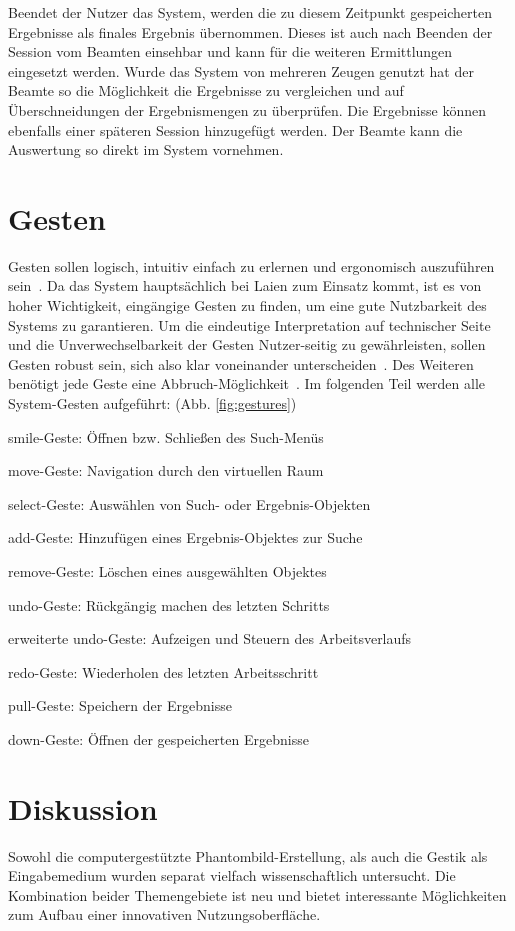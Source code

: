 \documentclass{sigchi-ext}
\begin{document}
Beendet der Nutzer das System, werden die zu diesem Zeitpunkt gespeicherten Ergebnisse als finales Ergebnis übernommen. Dieses ist auch nach Beenden der Session vom Beamten einsehbar und kann für die weiteren Ermittlungen eingesetzt werden. Wurde das System von mehreren Zeugen genutzt hat der Beamte so die Möglichkeit die Ergebnisse zu vergleichen und auf Überschneidungen der Ergebnismengen zu überprüfen. Die Ergebnisse können ebenfalls einer späteren Session hinzugefügt werden. Der Beamte kann die Auswertung so direkt im System vornehmen.

\section{Gesten}
Gesten sollen logisch, intuitiv einfach zu erlernen und ergonomisch auszuführen sein~\cite{3dinteraction:book}. 
Da das System hauptsächlich bei Laien zum Einsatz kommt, ist es von hoher Wichtigkeit, eingängige Gesten zu finden, um eine gute Nutzbarkeit des Systems zu garantieren.
Um die eindeutige Interpretation auf technischer Seite und die Unverwechselbarkeit der Gesten Nutzer-seitig zu gewährleisten, sollen Gesten robust sein, sich also klar voneinander unterscheiden~\cite{3dinteraction:book,Dorau11}.
Des Weiteren benötigt jede Geste eine Abbruch-Möglichkeit~\cite{Dorau11}. Im folgenden Teil werden alle System-Gesten aufgeführt: (Abb. \ref{fig:gestures})

smile-Geste: Öffnen bzw. Schließen des Such-Menüs

move-Geste: Navigation durch den virtuellen Raum

select-Geste: Auswählen von Such- oder Ergebnis-Objekten

add-Geste: Hinzufügen eines Ergebnis-Objektes zur Suche

remove-Geste: Löschen eines ausgewählten Objektes

undo-Geste: Rückgängig machen des letzten Schritts

erweiterte undo-Geste: Aufzeigen und Steuern des Arbeitsverlaufs 

redo-Geste: Wiederholen des letzten Arbeitsschritt

pull-Geste: Speichern der Ergebnisse

down-Geste: Öffnen der gespeicherten Ergebnisse

\section{Diskussion}
Sowohl die computergestützte Phantombild-Erstellung, als auch die
Gestik als Eingabemedium wurden separat vielfach wissenschaftlich
untersucht. Die Kombination beider Themengebiete ist neu und bietet
interessante Möglichkeiten zum Aufbau einer innovativen
Nutzungsoberfläche. 
\end{document}
